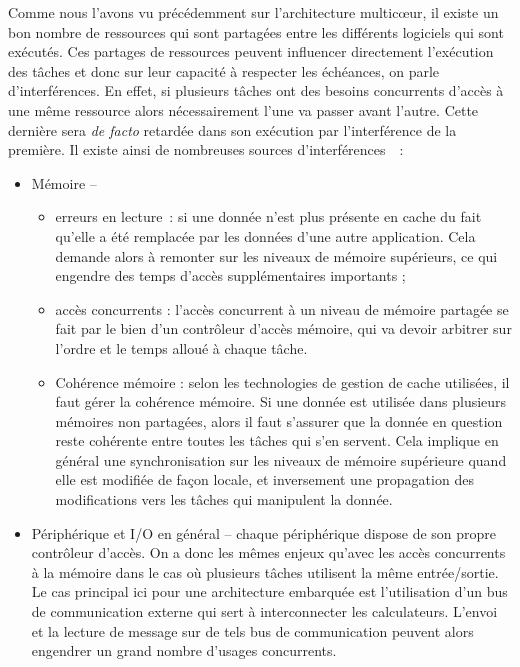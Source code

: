 \documentclass[french, a4paper, 11pt, twoside, pdftex]{StyleThese}
\begin{document}
	Comme nous l'avons vu précédemment sur l'architecture multicœur, il existe un bon nombre de ressources qui sont partagées entre les différents logiciels qui sont exécutés. Ces partages de ressources peuvent influencer directement l'exécution des tâches et donc sur leur capacité à respecter les échéances, on parle d'interférences. En effet, si plusieurs tâches ont des besoins concurrents d'accès à une même ressource alors nécessairement l'une va passer avant l'autre. Cette dernière sera \textit{de facto} retardée dans son exécution par l'interférence de la première. Il existe ainsi de nombreuses sources d'interférences~\cite{kotaba_multicore_2013}~: 
	\begin{itemize}
		\item Mémoire --
		\begin{itemize}[label=$ \circ $] %
			\item 	erreurs en lecture~: si une donnée n'est plus présente en cache du fait qu'elle a été remplacée par les données d'une autre application. Cela demande alors à remonter sur les niveaux de mémoire supérieurs, ce qui engendre des temps d'accès supplémentaires importants ;
			\item 	accès concurrents : l'accès concurrent à un niveau de mémoire partagée se fait par le bien d'un contrôleur d'accès mémoire, qui va devoir arbitrer sur l'ordre et le temps alloué à chaque tâche.
			\item 	Cohérence mémoire : selon les technologies de gestion de cache utilisées, il faut gérer la cohérence mémoire. Si une donnée est utilisée dans plusieurs mémoires non partagées, alors il faut s'assurer que la donnée en question reste cohérente entre toutes les tâches qui s'en servent. Cela implique en général une synchronisation sur les niveaux de mémoire supérieure quand elle est modifiée de façon locale, et inversement une propagation des modifications vers les tâches qui manipulent la donnée.
		\end{itemize}
		\item Périphérique et I/O en général --
			chaque périphérique dispose de son propre contrôleur d'accès. On a donc les mêmes enjeux qu'avec les accès concurrents à la mémoire dans le cas où plusieurs tâches utilisent la même entrée/sortie. Le cas principal ici pour une architecture embarquée est l'utilisation d'un bus de communication externe qui sert à interconnecter les calculateurs. L'envoi et la lecture de message sur de tels bus de communication peuvent alors engendrer un grand nombre d'usages concurrents. 

\end{itemize}
\end{document}
